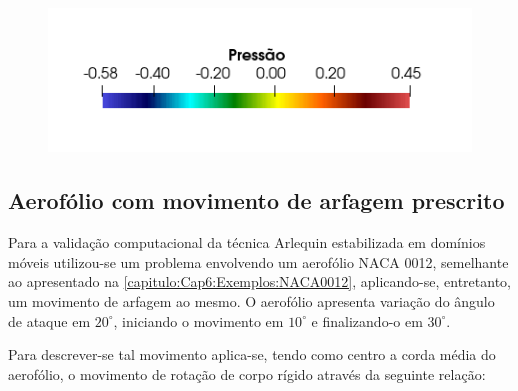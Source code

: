 \begin{figure}[!htbp]
	\\
	{\includegraphics[trim=0 0.8cm 0 0cm,clip=true,scale=0.4]{Imagens/Cap6/aerofolio_pressLegenda.png}}
	\label{fig:aerofolio_pressao}
\end{figure}

\subsection{Aerofólio com movimento de arfagem prescrito}

Para a validação computacional da técnica Arlequin estabilizada em domínios móveis  utilizou-se um problema envolvendo um aerofólio NACA 0012, semelhante ao apresentado na \autoref{capitulo:Cap6:Exemplos:NACA0012}, aplicando-se, entretanto, um movimento de arfagem ao mesmo. O aerofólio apresenta variação do ângulo de ataque em $20^{\circ}$, iniciando o movimento em $10^{\circ}$ e finalizando-o em $30^{\circ}$. 

Para descrever-se tal movimento aplica-se, tendo como centro a corda média do aerofólio, o movimento de rotação de corpo rígido através da seguinte relação:

